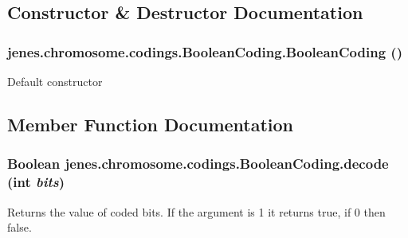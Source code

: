 \subsection{Constructor \& Destructor Documentation}
\hypertarget{classjenes_1_1chromosome_1_1codings_1_1_boolean_coding_3a8318406c4a080fa5b39899de1831df}{
\subsubsection[BooleanCoding]{\setlength{\rightskip}{0pt plus 5cm}jenes.chromosome.codings.BooleanCoding.BooleanCoding ()}}
\label{classjenes_1_1chromosome_1_1codings_1_1_boolean_coding_3a8318406c4a080fa5b39899de1831df}


Default constructor 

\subsection{Member Function Documentation}
\hypertarget{classjenes_1_1chromosome_1_1codings_1_1_boolean_coding_38188e39066ecd06e4c839bced2038d3}{
\subsubsection[decode]{\setlength{\rightskip}{0pt plus 5cm}Boolean jenes.chromosome.codings.BooleanCoding.decode (int {\em bits})}}
\label{classjenes_1_1chromosome_1_1codings_1_1_boolean_coding_38188e39066ecd06e4c839bced2038d3}


Returns the value of coded bits. If the argument is 1 it returns true, if 0 then false.

